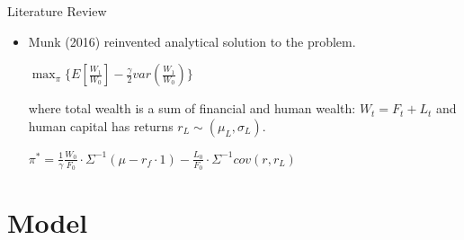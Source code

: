 \documentclass{beamer}
\begin{document}
\begin{frame}[allowframebreaks]{Literature Review}
\begin{itemize}
\framebreak

	\item Munk (2016) reinvented analytical solution to the problem.

\begin{center}
	$ \displaystyle\max_{\pi} \{ E[\frac{W_1}{W_0}] - \frac{\gamma}{2} var(\frac{W_1}{W_0}) \} $
\end{center}

where total wealth is a sum of financial and human wealth: $W_t = F_t + L_t$ and human capital has returns $r_L \sim (\mu_L, \sigma_L)$.

\begin{center}
	$\pi^* = \frac{1}{\gamma} \frac{W_0}{F_0} \cdot \Sigma^{-1} (\mu - r_f \cdot 1) - \frac{L_0}{F_0} \cdot \Sigma^{-1} cov(r,r_L)$
\end{center}


  \end{itemize}
\end{frame}

\section{Model}
\end{document}
